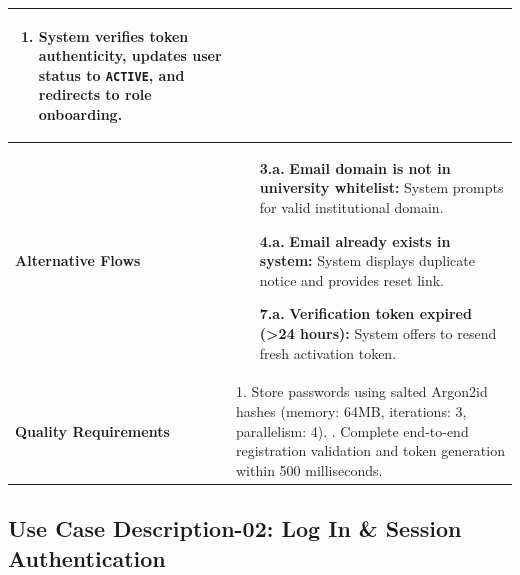 \begin{table}[H]
\begin{tabularx}{\textwidth}{|l|X|}
\begin{enumerate}[leftmargin=*, nosep]
    \item System verifies token authenticity, updates user status to \texttt{ACTIVE}, and redirects to role onboarding.
\end{enumerate} \\ \hline
\textbf{Alternative Flows} &
\begin{itemize}[leftmargin=*, nosep]
    \item[\textbf{3.a.}] \textbf{Email domain is not in university whitelist:} System prompts for valid institutional domain.
    \item[\textbf{4.a.}] \textbf{Email already exists in system:} System displays duplicate notice and provides reset link.
    \item[\textbf{7.a.}] \textbf{Verification token expired (>24 hours):} System offers to resend fresh activation token.
\end{itemize} \\ \hline
\textbf{Quality Requirements} & 
1. Store passwords using salted Argon2id hashes (memory: 64MB, iterations: 3, parallelism: 4). \newline
2. Complete end-to-end registration validation and token generation within 500 milliseconds. \\ \hline
\end{tabularx}
\end{table}

\clearpage
\subsection{Use Case Description-02: Log In \& Session Authentication}
\label{subsec:uc02}

